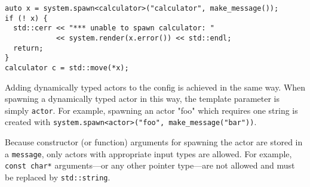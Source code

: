 \begin{lstlisting}
auto x = system.spawn<calculator>("calculator", make_message());
if (! x) {
  std::cerr << "*** unable to spawn calculator: "
            << system.render(x.error()) << std::endl;
  return;
}
calculator c = std::move(*x);
\end{lstlisting}

Adding dynamically typed actors to the config is achieved in the same way. When spawning a dynamically typed actor in this way, the template parameter is simply \lstinline^actor^. For example, spawning an actor "foo" which requires one string is created with \lstinline^system.spawn<actor>("foo", make_message("bar"))^.

Because constructor (or function) arguments for spawning the actor are stored in a \lstinline^message^, only actors with appropriate input types are allowed. For example, \lstinline^const char*^ arguments---or any other pointer type---are not allowed and must be replaced by \lstinline^std::string^.
